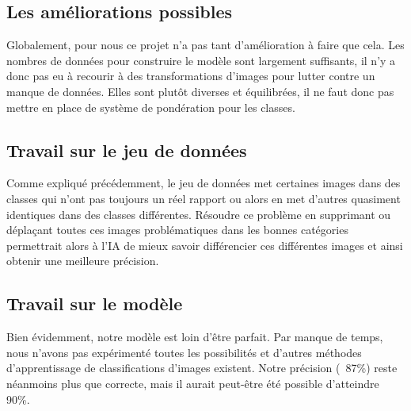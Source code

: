 \documentclass[12pt ,a4paper ]{article}
\begin{document}
\newpage
\begin{multicols}{2} 

\newpage
\section{Les améliorations possibles}
Globalement, pour nous ce projet n'a pas tant d'amélioration à faire que cela. Les nombres de données pour construire le modèle sont largement suffisants, il n'y a donc pas eu à recourir à des transformations d'images pour lutter contre un manque de données. Elles sont plutôt diverses et équilibrées, il ne faut donc pas mettre en place de système de pondération pour les classes.\\

\subsection{Travail sur le jeu de données}
Comme expliqué précédemment, le jeu de données met certaines images dans des classes qui n'ont pas toujours un réel rapport ou alors en met d'autres quasiment identiques dans des classes différentes. Résoudre ce problème en supprimant ou déplaçant toutes ces images problématiques dans les bonnes catégories permettrait alors à l'IA de mieux savoir différencier ces différentes images et ainsi obtenir une meilleure précision. 

\subsection{Travail sur le modèle}
Bien évidemment, notre modèle est loin d'être parfait. Par manque de temps, nous n'avons pas expérimenté toutes les possibilités et d'autres méthodes d'apprentissage de classifications d'images existent. Notre précision (~87\%)  reste néanmoins plus que correcte, mais il aurait peut-être été possible d'atteindre 90\%. 

\end{multicols}
\newpage
\end{document}
